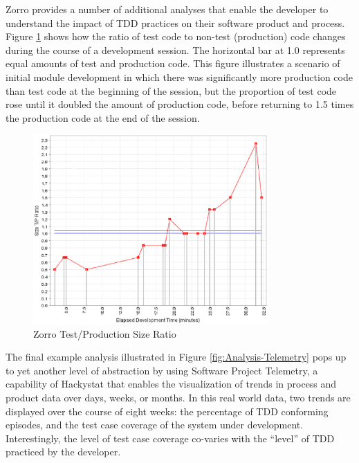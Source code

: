 \documentclass[smallextended]{svjour3}     %
\begin{document}
Zorro provides a number of additional analyses that enable the developer to
understand the impact of TDD practices on their software product and
process.  Figure \ref{fig:Analysis-Ratio} shows how the ratio of test code
to non-test (production) code changes during the course of a development
session.  The horizontal bar at 1.0 represents equal amounts of test and
production code.  This figure illustrates a scenario of initial module
development in which there was significantly more production code than test
code at the beginning of the session, but the proportion of test code rose
until it doubled the amount of production code, before returning to 1.5
times the production code at the end of the session.

\begin{figure}[th]
  \center
  \includegraphics[width=0.80\textwidth]{zorro-test-production-size-ratio.eps}
  \caption{Zorro Test/Production Size Ratio}
  \label{fig:Analysis-Ratio}
\end{figure} 

The final example analysis illustrated in Figure
\ref{fig:Analysis-Telemetry} pops up to yet another level of abstraction by
using Software Project Telemetry, a capability of Hackystat that enables
the visualization of trends in process and product data over days, weeks,
or months.  In this real world data, two trends are displayed over the
course of eight weeks: the percentage of TDD conforming episodes, and the
test case coverage of the system under development.  Interestingly, the
level of test case coverage co-varies with the ``level'' of TDD practiced
by the developer.
\end{document}
